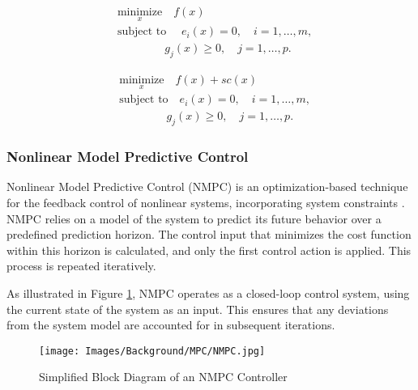 \begin{minipage}[t]{0.45\textwidth}
    \begin{equation}
        \begin{aligned}
            &\underset{x}{\text{minimize}} \quad f(x) \\
            &\text{subject to } \quad e_i(x) = 0, \quad i = 1, \dots, m, \\
            &\quad \quad \quad \quad \, g_j(x) \geq 0, \quad j = 1, \dots, p.
        \end{aligned}
        \label{eq:optimization_problem}
    \end{equation}
\end{minipage}%
\hfill
\begin{minipage}[t]{0.45\textwidth}
    \begin{equation}
        \begin{aligned}
            &\underset{x}{\text{minimize}} \quad f(x) + sc(x) \\
            &\text{subject to} \quad e_i(x) = 0, \quad i = 1, \dots, m, \\
            &\quad \quad \quad \quad \, g_j(x) \geq 0, \quad j = 1, \dots, p.
        \end{aligned}
        \label{eq:optimization_problem_with_soft_constraint}
    \end{equation}
\end{minipage}

\subsubsection{Nonlinear Model Predictive Control}

Nonlinear Model Predictive Control (NMPC) is an optimization-based technique for the feedback control of nonlinear systems, incorporating system constraints \cite{grune2017nonlinearmpc}. NMPC relies on a model of the system to predict its future behavior over a predefined prediction horizon. The control input that minimizes the cost function within this horizon is calculated, and only the first control action is applied. This process is repeated iteratively.

As illustrated in Figure \ref{fig:simplified_mpc_control_loop}, NMPC operates as a closed-loop control system, using the current state of the system as an input. This ensures that any deviations from the system model are accounted for in subsequent iterations.

\begin{figure}[h]
    \centering
    \texttt{[image: Images/Background/MPC/NMPC.jpg]}
    \caption{Simplified Block Diagram of an NMPC Controller}
    \label{fig:simplified_mpc_control_loop}
\end{figure}

